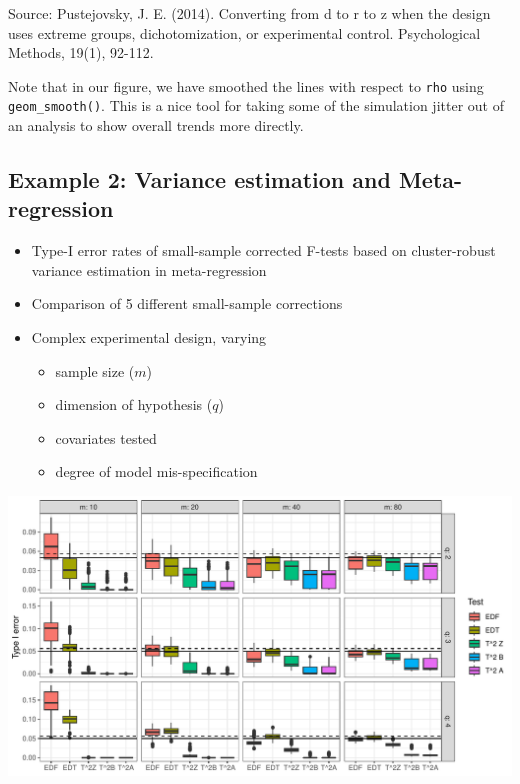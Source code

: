 \documentclass[
]{book}
\providecommand{\tightlist}{%
  \setlength{\itemsep}{0pt}\setlength{\parskip}{0pt}}
\begin{document}
Source: Pustejovsky, J. E. (2014). Converting from d to r to z when the design uses extreme groups, dichotomization, or experimental control. Psychological Methods, 19(1), 92-112.

Note that in our figure, we have smoothed the lines with respect to \texttt{rho} using \texttt{geom\_smooth()}.
This is a nice tool for taking some of the simulation jitter out of an analysis to show overall trends more directly.

\subsection{Example 2: Variance estimation and Meta-regression}\label{example-2-variance-estimation-and-meta-regression}

\begin{itemize}
\tightlist
\item
  Type-I error rates of small-sample corrected F-tests based on cluster-robust variance estimation in meta-regression
\item
  Comparison of 5 different small-sample corrections
\item
  Complex experimental design, varying

  \begin{itemize}
  \tightlist
  \item
    sample size (\(m\))
  \item
    dimension of hypothesis (\(q\))
  \item
    covariates tested
  \item
    degree of model mis-specification
  \end{itemize}
\end{itemize}

\begin{center}\includegraphics[width=0.75\linewidth]{Designing-Simulations-in-R_files/figure-latex/unnamed-chunk-195-1} \end{center}
\end{document}
